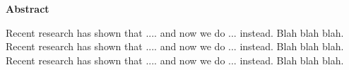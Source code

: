 \thispagestyle{empty}
\null\vfil
\begin{center}
{\large\bfseries Abstract}
\end{center}
Recent research has shown that .... and now we do ... instead.  Blah blah blah. 
Recent research has shown that .... and now we do ... instead.  Blah blah blah. 
Recent research has shown that .... and now we do ... instead.  Blah blah 
blah.{\par\vfil\null}
